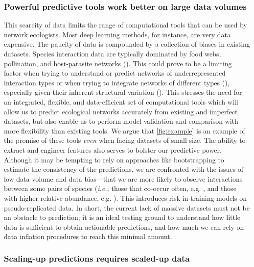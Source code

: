 \begin{refsection}
\subsubsection{Powerful predictive tools work better on large data
volumes}\label{powerful-predictive-tools-work-better-on-large-data-volumes}

This scarcity of data limits the range of computational tools that can
be used by network ecologists. Most deep learning methods, for instance,
are very data expensive. The paucity of data is compounded by a
collection of biases in existing datasets. Species interaction data are
typically dominated by food webs, pollination, and host-parasite
networks (\cite{Ings2009EcoNet, Poisot2020EnvBia}). This could prove to
be a limiting factor when trying to understand or predict networks of
underrepresented interaction types or when trying to integrate networks
of different types (\cite{Fontaine2011EcoEvo}), especially given their
inherent structural variation (\cite{Michalska-Smith2019TelEco}). This
stresses the need for an integrated, flexible, and data-efficient set of
computational tools which will allow us to predict ecological networks
accurately from existing and imperfect datasets, but also enable us to
perform model validation and comparison with more flexibility than
existing tools. We argue that \autoref{fig:example} is an example of the promise
of these tools \emph{even} when facing datasets of small size. The
ability to extract and engineer features also serves to bolster our
predictive power. Although it may be tempting to rely on approaches like
bootstrapping to estimate the consistency of the predictions, we are
confronted with the issues of low data volume and data bias---that we
are more likely to observe interactions between some pairs of species
(\emph{i.e.,} those that co-occur often, e.g. \cite{Cazelles2015TheSpe}, and those
with higher relative abundance, e.g. \cite{Vazquez2009UniPat}). This
introduces risk in training models on pseudo-replicated data. In short,
the current lack of massive datasets must not be an obstacle to
prediction; it is an ideal testing ground to understand how little data
is sufficient to obtain actionable predictions, and how much we can rely
on data inflation procedures to reach this minimal amount.

\subsubsection{Scaling-up predictions requires scaled-up
data}\label{scaling-up-predictions-requires-scaled-up-data}


\end{refsection}
